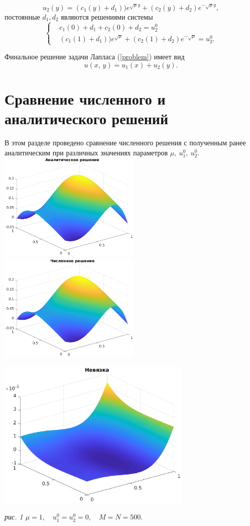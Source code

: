 \documentclass[11pt]{article}
\begin{document}
$$u_2(y) = (c_1(y) + d_1))e^{\sqrt{\mu}y} + (c_2(y) + d_2) e^{-\sqrt{\mu}y},$$
постоянные $d_1, d_2$ являются решениями системы
\[
\left\{
	\begin{aligned}
	& c_1(0) + d_1 + c_2(0) + d_2 = u_2^0 \\
	& (c_1(1) + d_1))e^{\sqrt{\mu}} + (c_2(1) + d_2) e^{-\sqrt{\mu}} = u_2^0.
	\end{aligned}	
\right.
\]

Финальное решение задачи Лапласа (\ref{problem}) имеет вид
$$u(x, \, y) = u_1(x) + u_2(y).$$

\newpage
\section{Сравнение численного и аналитического решений}
В этом разделе проведено сравнение численного решения с полученным ранее аналитическим при различных значениях параметров 
$\mu,\ u_1^0,\ u_2^0$.\\
\noindent
\includegraphics[width=0.51\textwidth]{sol_a_1.eps}
\includegraphics[width=0.51\textwidth]{sol_n_1.eps}
\begin{center}
\includegraphics[width=0.7\textwidth]{resid1.eps}

\it{рис. 1 \quad $\mu = 1, \quad u_1^0 = u_2^0 = 0, \quad M = N = 500.$}
\end{center}
\end{document}
